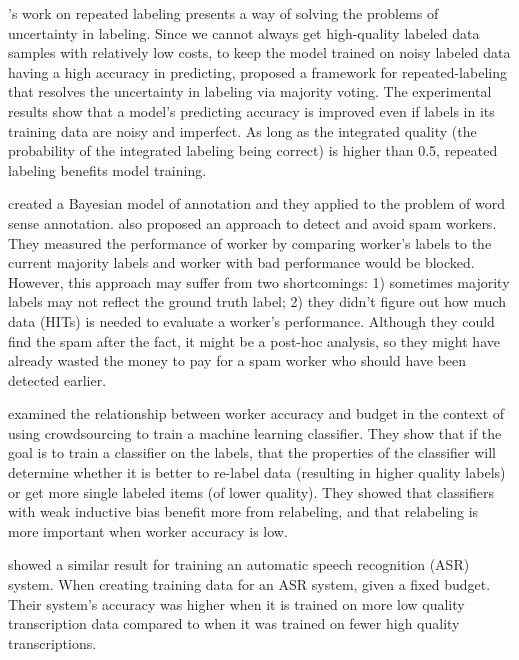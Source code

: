 \documentclass[11pt,letterpaper]{article}
\begin{document}
's work on repeated labeling presents a way of solving the problems of uncertainty in labeling. Since we cannot always get high-quality labeled data samples with relatively low costs, to keep the model trained on noisy labeled data having a high accuracy in predicting,  proposed a framework for repeated-labeling that resolves the uncertainty in labeling via majority voting. The experimental results show that a model's predicting accuracy is improved even if labels in its training data are noisy and imperfect.
As long as the integrated quality (the probability of the integrated labeling being correct) is higher than 0.5, repeated labeling benefits model training. 

 created a Bayesian model of annotation and they applied to the problem of word sense annotation.  also proposed an approach to detect and avoid spam workers. 
They measured the performance of worker by comparing worker's labels to the current majority labels and worker with bad performance would be blocked. However, this approach may suffer from two shortcomings: 1) sometimes majority labels may not reflect the ground truth label; 2) they didn't figure out  how much data (HITs) is needed to evaluate a worker's performance. Although they could find the spam after the fact, it might be a post-hoc analysis, so they might have already wasted the money to pay for a spam worker who should have been detected earlier.

 examined the relationship between worker accuracy and budget in the context of using crowdsourcing to train a machine learning classifier.  They show that if the goal is to train a classifier on the labels, that the properties of the classifier will determine whether it is better to re-label data (resulting in higher quality labels) or get more single labeled items (of lower quality). They showed that classifiers with weak inductive bias  benefit more from relabeling, and that relabeling is more important when worker accuracy is low. %

 showed a similar result for training an automatic speech recognition (ASR) system.  When creating training data for an ASR system, given a fixed budget. Their system's accuracy was higher when it is trained on more low quality transcription data compared to when it was trained on fewer high quality transcriptions.
\end{document}
